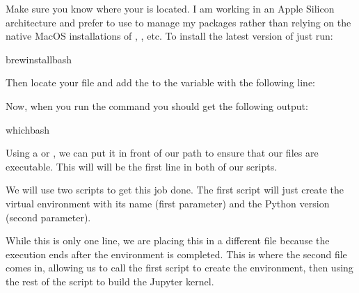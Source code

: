 \documentclass[letterpaper,12pt,english]{sphinxmanual}
\let\sphinxpxdimen\pdfpxdimen\else\newdimen\sphinxpxdimen
\begin{document}
\sphinxAtStartPar
\sphinxincludegraphics[width=946\sphinxpxdimen,height=1176\sphinxpxdimen]{{lua-dir}.jpg}

\sphinxAtStartPar
Make sure you know where your  is located. I am working in an Apple Silicon architecture and prefer to use  to manage my packages rather than relying on the native MacOS installations of , , etc. To install the latest version of  just run:

\begin{sphinxVerbatim}[commandchars=\\\{\}]
brewinstallbash
\end{sphinxVerbatim}

\sphinxAtStartPar
Then locate your  file and add the  to the  variable with the following line:

\begin{sphinxVerbatim}[commandchars=\\\{\}]
\end{sphinxVerbatim}

\sphinxAtStartPar
Now, when you run the  command you should get the following output:

\begin{sphinxVerbatim}[commandchars=\\\{\}]
whichbash
\end{sphinxVerbatim}

\sphinxAtStartPar
{}

\sphinxAtStartPar
Using a  or \sphinxcode{\sphinxupquote{\#!}}, we can put it in front of our path to ensure that our files are executable. This will will be the first line in both of our scripts.

\sphinxAtStartPar
We will use two scripts to get this job done. The first script will just create the virtual environment with its name (first parameter) and the Python version (second parameter).

\sphinxAtStartPar
While this is only one line, we are placing this in a different file because the execution ends after the environment is completed. This is where the second file comes in, allowing us to call the first script to create the environment, then using the rest of the script to build the Jupyter kernel.
\end{document}

